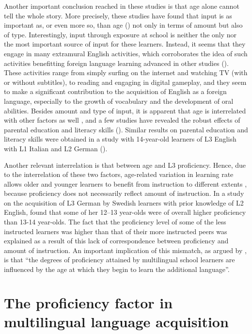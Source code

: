 \documentclass[output=paper]{../langscibook}
\begin{document}
Another important conclusion reached in these studies is that age alone cannot tell the whole story. More precisely, these studies have found that input is as important as, or even more so, than age (\citealt{Muñoz2006, Muñoz2014, Muñoz2019, PfenningerSingleton2017}) not only in terms of amount but also of type. Interestingly, input through exposure at school is neither the only nor the most important source of input for these learners. Instead, it seems that they engage in many extramural English activities, which corroborates the idea of such activities benefitting foreign language learning advanced in other studies (\citealt{SundqvistSylvén2014}). These activities range from simply surfing on the internet and watching TV (with or without subtitles), to reading and engaging in digital gameplay, and they seem to make a significant contribution to the acquisition of English as a foreign language, especially to the growth of vocabulary and the development of oral abilities. Besides amount and type of input, it is apparent that age is interrelated with other factors as well \citep{Muñoz2014}, and a few studies have revealed the robust effects of parental education and literacy skills (\citealt{PfenningerSingleton2017, Muñoz2019, MuñozSingleton2019}). Similar results on parental education and literacy skills were obtained in a study with 14-year-old learners of L3 English with L1 Italian and L2 German (\citealt{DeAngelis2015}).

Another relevant interrelation is that between age and L3 proficiency. Hence, due to the interrelation of these two factors, age-related variation in learning rate allows older and younger learners to benefit from instruction to different extents \citep{Muñoz2006}, because proficiency does not necessarily reflect amount of instruction. In a study on the acquisition of L3 German by Swedish learners with prior knowledge of L2 English, \citet{Sayehli2001} found that some of her 12--13 year-olds were of overall higher proficiency than 13-14 year-olds. The fact that the proficiency level of some of the less instructed learners was higher than that of their more instructed peers was explained as a result of this lack of correspondence between proficiency and amount of instruction. An important implication of this mismatch, as argued by \citet[214]{MuñozSingleton2019}, is that “the degrees of proficiency attained by multilingual school learners are influenced by the age at which they begin to learn the additional language”.

\section{The proficiency factor in multilingual language acquisition}\label{sec:sanchez1:3}
\end{document}
